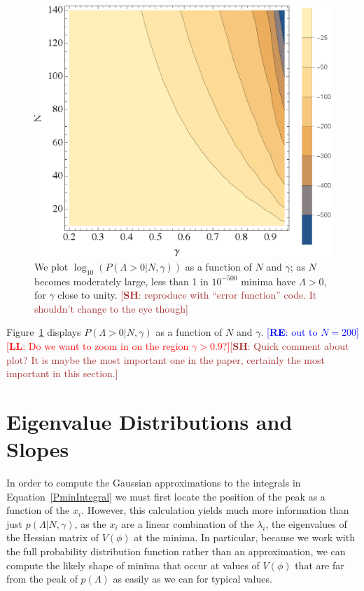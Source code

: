 \documentclass[12pt]{article}
\newcommand{\re}[1]{\textcolor{blue}{[{\bf RE}: #1]}}
\newcommand{\lfl}[1]{\textcolor{red}{[{\bf LL}: #1]}}
\newcommand{\SH}[1]{\textcolor{brown}{[{\bf SH}: #1]}}
\begin{document}

\begin{figure} 
  \centering
  \includegraphics[width=.6 \linewidth]{histo.eps}
  \caption{We plot $\log_{10}(P(\Lambda>0|N,\gamma))$ as a function of $N$ and $\gamma$; as $N$ becomes moderately large, less than 1 in $10^{-500}$ minima have $\Lambda>0$, for $\gamma$  close to unity.  \SH{reproduce with ``error function'' code. It shouldn't change to the eye though}}
  \label{fullcontourplot}
\end{figure}

Figure~\ref{fullcontourplot} displays  $P(\Lambda >0 |N,\gamma)$ as a function of $N$ and $\gamma$.  \re{out to $N=200$} \lfl{Do we want to zoom in on the region $\gamma > 0.9$?}\SH{Quick comment about plot? It is maybe the most important one in the paper, certainly the most important in this section.}


\section{Eigenvalue Distributions and Slopes} 

In order to compute the Gaussian  approximations to the integrals in Equation~\ref{PminIntegral} we must first locate the position of the peak as a function of the $x_i$. However, this calculation yields much more information than just $p(\Lambda  |N,\gamma)$, as the $x_i$ are a linear combination of the $\lambda_i$, the eigenvalues of the Hessian matrix of $V(\phi)$ at the minima. In particular, because we work with the full probability distribution function rather than an approximation, we can compute the likely shape of minima that occur at values of $V(\phi)$ that  are  far from the peak of $p(\Lambda)$ as easily as we can for typical values.  
\end{document}
